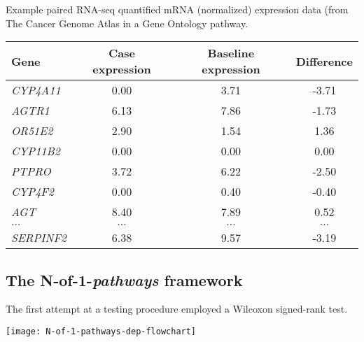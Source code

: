 \documentclass[a0,portrait]{a0poster}
\begin{document}
\begin{multicols}{3}
Example paired RNA-seq quantified mRNA (normalized) expression data (from The Cancer Genome Atlas\cite{weinstein2013cancer} in a Gene Ontology\cite{Ashburner2000} pathway.

\begin{table}
\label{tab:TNBCdata}
\begin{tabular}{l|ccc}
\hline
Gene & Case expression & Baseline expression & Difference\\
\hline
  \emph{CYP4A11}   & 0.00  & 3.71  & -3.71 \\
  \emph{AGTR1}     & 6.13  & 7.86  & -1.73 \\
  \emph{OR51E2}    & 2.90  & 1.54  & 1.36 \\
  \emph{CYP11B2}   & 0.00  & 0.00  & \phantom{-}0.00 \\
  \emph{PTPRO}     & 3.72  & 6.22  & -2.50 \\
  \emph{CYP4F2}    & 0.00  & 0.40  & -0.40 \\
  \emph{AGT}       & 8.40  & 7.89  & \phantom{-}0.52 \\
  \emph{$\ldots$}       & $\ldots$  & $\ldots$  & $\ldots$ \\
  \emph{SERPINF2}  & 6.38  & 9.57  & -3.19 \\
\hline
\end{tabular}
\end{table}


\color{Black} %
\subsection*{The N-of-1-{\itshape pathways} framework}

The first attempt at a testing procedure employed a Wilcoxon signed-rank test\cite{Gardeux2014}.

\begin{center}\vspace{1cm}
\texttt{[image: N-of-1-pathways-dep-flowchart]}
\end{center}%


\end{multicols}
\end{document}
